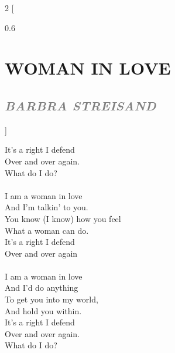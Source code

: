 \documentclass[100pt,a4paper]{report}
\newenvironment{song2}[2]
	{	
    	\begin{multicols*}{2}
		[
			\begin{spacing}{0.6}
				\section*{\LARGE\centering \MakeUppercase{\textbf{{#1}}}}
				\subsection*{\Large\centering \textit{\textcolor{gray}{\MakeUppercase{{#2}}}}}
			\end{spacing}
		]
		\Large
	}
	{
	\end{multicols*}
	\newpage
    }
\begin{document}
\begin{song2}{Woman in Love}{Barbra Streisand}
It's a right I defend\\
Over and over again.\\
What do I do?\\
\\
I am a woman in love\\
And I'm talkin' to you.\\
You know (I know) how you feel\\
What a woman can do.\\
It's a right I defend\\
Over and over again\\
\\
I am a woman in love\\
And I'd do anything\\
To get you into my world,\\
And hold you within.\\
It's a right I defend\\
Over and over again.\\
What do I do? \\
\end{song2}
\end{document}
